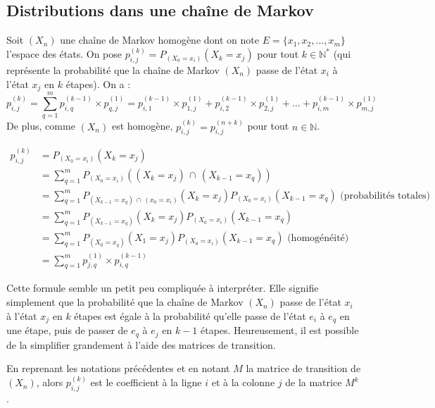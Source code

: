 	\subsection{Distributions dans une chaîne de Markov}

	\begin{formula}[Proposition]
		Soit $(X_n)$ une chaîne de Markov homogène dont on note $E = \{x_1, x_2, \dots, x_m\}$ l'espace des états. On pose $p_{i,j}^{(k)} = P_{(X_0 = x_i)}(X_k = x_j)$ pour tout $k \in \mathbb{N}^*$ (qui représente la probabilité que la chaîne de Markov $(X_n)$ passe de l'état $x_i$ à l'état $x_j$ en $k$ étapes). On a :
		\[ p_{i,j}^{(k)} = \sum_{q=1}^m p_{i,q}^{(k-1)} \times p_{q,j}^{(1)} = p_{i,1}^{(k-1)} \times p_{1,j}^{(1)} + p_{i,2}^{(k-1)} \times p_{2,j}^{(1)} + \dots + p_{i,m}^{(k-1)} \times p_{m,j}^{(1)} \]
		De plus, comme $(X_n)$ est homogène, $p_{i,j}^{(k)} = p_{i,j}^{(n+k)}$ pour tout $n \in \mathbb{N}$.
	\end{formula}

	\begin{demonstration}[Proposition]
		\contentwidth[big]
		\entretitreetliste
		\begin{align*}
			p_{i,j}^{(k)} &= P_{(X_0 = x_i)}(X_k = x_j) \\
			&= \sum_{q=1}^m P_{(X_0 = x_i)}((X_k = x_j) \, \cap \, (X_{k-1} = x_q)) \\
			&= \sum_{q=1}^m P_{(X_{k-1} = x_q) \, \cap \, (x_0 = x_i)}(X_k = x_j) P_{(X_0 = x_i)}(X_{k-1} = x_q) \text{ (probabilités totales)} \\
			&= \sum_{q=1}^m P_{(X_{k-1} = x_q)}(X_k = x_j) P_{(X_0 = x_i)}(X_{k-1} = x_q) \\
			&= \sum_{q=1}^m P_{(X_0 = x_q)}(X_1 = x_j) P_{(X_0 = x_i)}(X_{k-1} = x_q) \text{ (homogénéité)} \\
			&= \sum_{q=1}^m p_{j,q}^{(1)} \times p_{i,q}^{(k-1)}
		\end{align*}
	\end{demonstration}

	Cette formule semble un petit peu compliquée à interpréter. Elle signifie simplement que la probabilité que la chaîne de Markov $(X_n)$ passe de l'état $x_i$ à l'état $x_j$ en $k$ étapes est égale à la probabilité qu'elle passe de l'état $e_i$ à $e_q$ en une étape, puis de passer de $e_q$ à $e_j$ en $k-1$ étapes. Heureusement, il est possible de la simplifier grandement à l'aide des matrices de transition.

	\begin{formula}
		En reprenant les notations précédentes et en notant $M$ la matrice de transition de $(X_n)$, alors $p_{i,j}^{(k)}$ est le coefficient à la ligne $i$ et à la colonne $j$ de la matrice $M^k$.
	\end{formula}

